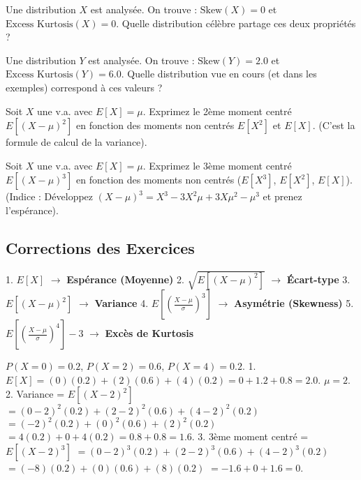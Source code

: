 \begin{exercicebox}
Une distribution $X$ est analysée. On trouve :
$\text{Skew}(X) = 0$ et $\text{Excess Kurtosis}(X) = 0$.
Quelle distribution célèbre partage ces deux propriétés ?
\end{exercicebox}

\begin{exercicebox}
Une distribution $Y$ est analysée. On trouve :
$\text{Skew}(Y) = 2.0$ et $\text{Excess Kurtosis}(Y) = 6.0$.
Quelle distribution vue en cours (et dans les exemples) correspond à ces valeurs ?
\end{exercicebox}

\begin{exercicebox}
Soit $X$ une v.a. avec $E[X] = \mu$.
Exprimez le 2ème moment centré $E[(X-\mu)^2]$ en fonction des moments non centrés $E[X^2]$ et $E[X]$. (C'est la formule de calcul de la variance).
\end{exercicebox}

\begin{exercicebox}
Soit $X$ une v.a. avec $E[X] = \mu$.
Exprimez le 3ème moment centré $E[(X-\mu)^3]$ en fonction des moments non centrés ($E[X^3]$, $E[X^2]$, $E[X]$).
(Indice : Développez $(X-\mu)^3 = X^3 - 3X^2\mu + 3X\mu^2 - \mu^3$ et prenez l'espérance).
\end{exercicebox}

\subsection{Corrections des Exercices}


\begin{correctionbox}
1.  $E[X]$ $\rightarrow$ \textbf{Espérance (Moyenne)}
2.  $\sqrt{E[(X-\mu)^2]}$ $\rightarrow$ \textbf{Écart-type}
3.  $E[(X-\mu)^2]$ $\rightarrow$ \textbf{Variance}
4.  $E[\left(\frac{X-\mu}{\sigma}\right)^3]$ $\rightarrow$ \textbf{Asymétrie (Skewness)}
5.  $E[\left(\frac{X-\mu}{\sigma}\right)^4] - 3$ $\rightarrow$ \textbf{Excès de Kurtosis}
\end{correctionbox}

\begin{correctionbox}
$P(X=0)=0.2$, $P(X=2)=0.6$, $P(X=4)=0.2$.
1.  $E[X] = (0)(0.2) + (2)(0.6) + (4)(0.2) = 0 + 1.2 + 0.8 = 2.0$. $\mu=2$.
2.  Variance = $E[(X-2)^2]$
    $= (0-2)^2(0.2) + (2-2)^2(0.6) + (4-2)^2(0.2)$
    $= (-2)^2(0.2) + (0)^2(0.6) + (2)^2(0.2)$
    $= 4(0.2) + 0 + 4(0.2) = 0.8 + 0.8 = 1.6$.
3.  3ème moment centré = $E[(X-2)^3]$
    $= (0-2)^3(0.2) + (2-2)^3(0.6) + (4-2)^3(0.2)$
    $= (-8)(0.2) + (0)(0.6) + (8)(0.2)$
    $= -1.6 + 0 + 1.6 = 0$.
\end{correctionbox}

